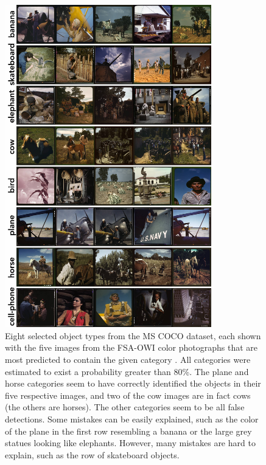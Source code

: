 \documentclass[10pt, a4paper]{article}
\begin{document}
\begin{figure}[!ht]
\begin{center}
\includegraphics[width=0.8\textwidth]{../figures/max_things_grid_labels.jpg}
\caption{Eight selected object types from the MS COCO dataset, each shown with
the five images from the FSA-OWI color photographs that are most predicted to
contain the given category \protect\cite{wu2019detectron2}.
All categories were estimated to exist a probability
greater than 80\%. The plane and horse categories seem to have correctly
identified the objects in their five respective images, and two of the cow images
are in fact cows (the others are horses). The other categories seem to be all
false detections. Some mistakes
can be easily explained, such as the color of the plane in the first row
resembling a banana or the large grey statues looking like elephants. However,
many mistakes are hard to explain, such as the row of skateboard objects.
}
\label{fig:things}
\end{center}
\end{figure}
\end{document}
